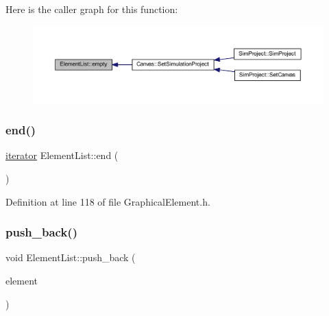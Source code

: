 Here is the caller graph for this function\+:
\nopagebreak
\begin{figure}[H]
\begin{center}
\leavevmode
\includegraphics[width=350pt]{class_element_list_aff93ee82e54aa171e792b0a86cafd08a_icgraph}
\end{center}
\end{figure}
\mbox{\label{class_element_list_a7e5dfdae6a16e385bbdd1564fd5cf200}} 
\subsubsection{\texorpdfstring{end()}{end()}}
{\footnotesize\ttfamily \hyperlink{class_element_list_a10e1b0c17ebe441fcd035fcf0a00d25e}{iterator} Element\+List\+::end (\begin{DoxyParamCaption}{ }\end{DoxyParamCaption})\hspace{0.3cm}{\ttfamily [inline]}}



Definition at line 118 of file Graphical\+Element.\+h.

\mbox{\label{class_element_list_a0c7327348fe7c7d8ad032ad4a71eed39}} 
\subsubsection{\texorpdfstring{push\+\_\+back()}{push\_back()}}
{\footnotesize\ttfamily void Element\+List\+::push\+\_\+back (\begin{DoxyParamCaption}\item[{\hyperlink{class_graphical_element}{Graphical\+Element} $\ast$}]{element }\end{DoxyParamCaption})\hspace{0.3cm}{\ttfamily [inline]}}



